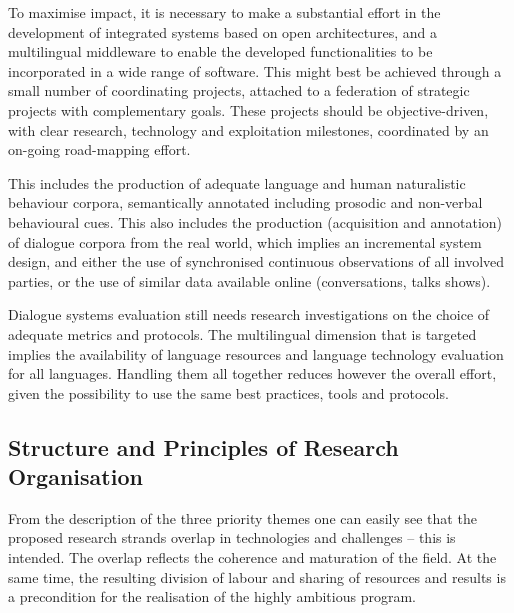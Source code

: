 \documentclass[10pt, plain]{../../metanetpaper}
\begin{document}
\begin{multicols}{2}
To maximise impact, it is necessary to make a substantial effort in the development of integrated systems based on open architectures, and a multilingual middleware to enable the developed functionalities to be incorporated in a wide range of software. This might best be achieved through a small number of coordinating projects, attached to a federation of strategic projects with complementary goals. These projects should be objective-driven, with clear research, technology and exploitation milestones, coordinated by an on-going road-mapping effort.
 
This includes the production of adequate language and human naturalistic behaviour corpora, semantically annotated including prosodic and non-verbal behavioural cues. This also includes the production (acquisition and annotation) of dialogue corpora from the real world, which implies an incremental system design, and either the use of synchronised continuous observations of all involved parties, or the use of similar data available online (conversations, talks shows).
 
Dialogue systems evaluation still needs research investigations on the choice of adequate metrics and protocols. The multilingual dimension that is targeted implies the availability of language resources and language technology evaluation for all languages. Handling them all together reduces however the overall effort, given the possibility to use the same best practices, tools and protocols.

\subsection{Structure and Principles of Research Organisation}
\label{sec:struct-princ-research-org}

From the description of the three priority themes one can easily see that the proposed research strands overlap in technologies and challenges -- this is intended. The overlap reflects the coherence and maturation of the field. At the same time, the resulting division of labour and sharing of resources and results is a precondition for the realisation of the highly ambitious program.


\end{multicols}
\end{document}
